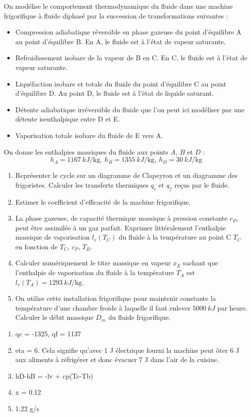 On modélise le comportement thermodynamique du fluide dans une machine frigorifique à fluide diphasé par la succession de transformations suivantes :

\begin{itemize}
	\item Compression adiabatique réversible en phase gazeuse du point d'équilibre A au point d'équilibre B. En A, le fluide est à l'état de vapeur saturante.
	\item Refroidissement isobare de la vapeur de B en C. En C, le fluide est à l'état de vapeur saturante.
	\item Liquéfaction isobare et totale du fluide du point d'équilibre C au point d'équilibre D. Au point D, le fluide est à l'état de liquide saturant.
	\item Détente adiabatique irréversible du fluide que l'on peut ici modéliser par une détente isenthalpique entre D et E.
	\item Vaporisation totale isobare du fluide de E vers A.
\end{itemize}

On donne les enthalpies massiques du fluide aux points $A$, $B$ et $D$ : $$h_A = \SI{1167}{kJ\per\kilogram},~h_B = \SI{1355}{kJ\per\kilogram},~h_D = \SI{30}{kJ\per\kilogram}$$

\begin{enumerate}
	\item Représenter le cycle sur un diagramme de Clapeyron et un diagramme des frigoristes. Calculer les transferts thermiques $q_c$ et $q_f$ reçus par le fluide.
	\item Estimer le coefficient d'efficacité de la machine frigorifique.
	\item La phase gazeuse, de capacité thermique massique à pression constante $c_P$, peut être assimilée à un gaz parfait. Exprimer littéralement l'enthalpie massique de vaporisation $l_v(T_C)$ du fluide à la température au point C $T_C$ en fonction de $T_C$, $c_P$, $T_B$.
	\item Calculer numériquement le titre massique en vapeur $x_E$ sachant que l'enthalpie de vaporisation du fluide à la température $T_A$ est $l_v(T_A) = \SI{1293}{kJ\per\kilogram}$.
	\item On utilise cette installation frigorifique pour maintenir constante la température d'une chambre froide à laquelle il faut enlever $\SI{5000}{kJ}$ par heure. Calculer le débit massique $D_m$ du fluide frigorifique.
\end{enumerate}

\begin{enumerate}
	\item qc = -1325, qf = 1137
	\item eta = 6. Cela signifie qu'avec 1 J électrique fourni la machine peut ôter 6 J aux aliments à réfrigérer et donc évacuer 7 J dans l'air de la cuisine.
	\item hD-hB = -lv + cp(Tc-Tb)
	\item x = 0.12
	\item 1.22 g/s
\end{enumerate}

